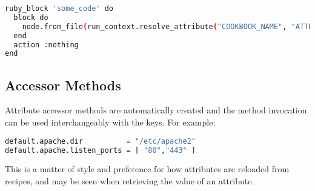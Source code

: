 \begin{lstlisting}[language=Bash,label=lst:cookbook-recipes12]
ruby_block 'some_code' do
  block do
    node.from_file(run_context.resolve_attribute("COOKBOOK_NAME", "ATTR_FILE"))
  end
  action :nothing
end
\end{lstlisting}

\subsection{Accessor Methods}

Attribute accessor methods are automatically created and the method invocation can be used interchangeably with the keys. For example:

\begin{lstlisting}[language=Bash,label=lst:cookbook-recipes13]
default.apache.dir          = "/etc/apache2"
default.apache.listen_ports = [ "80","443" ]
\end{lstlisting}

This is a matter of style and preference for how attributes are reloaded from recipes, and may be seen when retrieving the value of an attribute.